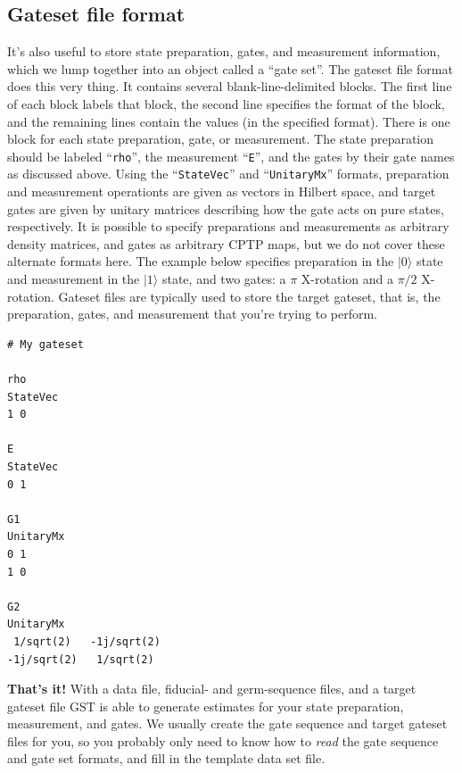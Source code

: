 \documentclass{article}[11pt]
\begin{document}
\subsection{Gateset file format}
It's also useful to store state preparation, gates, and measurement information, which we lump together into an object called a ``gate set''.  The gateset file format does this very thing.  It contains several blank-line-delimited blocks.  The first line of each block labels that block, the second line specifies the format of the block, and the remaining lines contain the values (in the specified format).  There is one block for each state preparation, gate, or measurement.  The state preparation should be labeled ``\texttt{rho}'', the measurement ``\texttt{E}'', and the gates by their gate names as discussed above.  Using the ``\texttt{StateVec}'' and ``\texttt{UnitaryMx}'' formats, preparation and measurement operationts are given as vectors in Hilbert space, and target gates are given by unitary matrices describing how the gate acts on pure states, respectively.  It is possible to specify preparations and measurements as arbitrary density matrices, and gates as arbitrary CPTP maps, but we do not cover these alternate formats here.  The example below specifies preparation in the $|0\rangle$ state and measurement in the $|1\rangle$ state, and two gates: a $\pi$ X-rotation and a $\pi/2$ X-rotation.  Gateset files are typically used to store the target gateset, that is, the preparation, gates, and measurement that you're trying to perform.

\begin{minipage}{\linewidth}
\begin{lstlisting}[frame=single,caption=Example gate set file]
# My gateset

rho
StateVec
1 0

E
StateVec
0 1

G1
UnitaryMx
0 1
1 0

G2
UnitaryMx
 1/sqrt(2)   -1j/sqrt(2)
-1j/sqrt(2)   1/sqrt(2)
\end{lstlisting}
\end{minipage}


\noindent \textbf{That's it!}  With a data file, fiducial- and germ-sequence files, and a target gateset file GST is able to generate estimates for your state preparation, measurement, and gates.  We usually create the gate sequence and target gateset files for you, so you probably only need to know how to \emph{read} the gate sequence and gate set formats, and fill in the template data set file.
\end{document}
